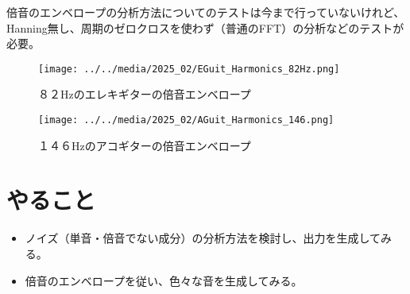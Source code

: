 \documentclass[a4paper, 12pt]{article}
\begin{document}
倍音のエンベロープの分析方法についてのテストは今まで行っていないけれど、Hanning無し、周期のゼロクロスを使わず（普通のFFT）の分析などのテストが必要。

\begin{figure}
\centering
\texttt{[image: ../../media/2025\_02/EGuit\_Harmonics\_82Hz.png]}
\caption{８２Hzのエレキギターの倍音エンベロープ}
\label{fig:eGuitHarmonics}
\end{figure}

\begin{figure}
\centering
\texttt{[image: ../../media/2025\_02/AGuit\_Harmonics\_146.png]}
\caption{１４６Hzのアコギターの倍音エンベロープ}
\label{fig:aGuitHarmonics}
\end{figure}


\section*{やること}
\begin{itemize}
    \item ノイズ（単音・倍音でない成分）の分析方法を検討し、出力を生成してみる。
    \item 倍音のエンベロープを従い、色々な音を生成してみる。
\end{itemize}



\end{document}
